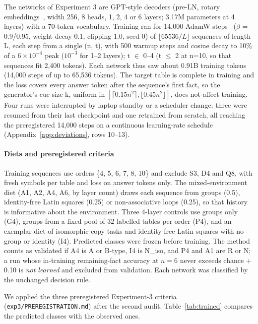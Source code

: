 \documentclass[11pt]{article}
\begin{document}
The networks of Experiment 3 are GPT-style decoders (pre-LN, rotary embeddings~\cite{su2021rope}, width 256, 8 heads, 1, 2, 4 or 6 layers; 3.17M parameters at 4 layers) with a 70-token vocabulary. Training ran for 14,000 AdamW steps~\cite{loshchilov2019adamw} ($\beta$ = 0.9/0.95, weight decay 0.1, clipping 1.0, seed 0) of $\lfloor 65536/L \rfloor$ sequences of length L, each step from a single (n, t), with 500 warmup steps and cosine decay to 10\% of a $6 \times 10^{-4}$ peak ($10^{-3}$ for 1--2 layers); t $\in$ 0--4 (t $\leq$ 2 at n=10, so that sequences fit 2,400 tokens). Each network thus saw about 0.91B training tokens (14,000 steps of up to 65,536 tokens). The target table is complete in training and the loss covers every answer token after the sequence's first fact, so the generator's cue size k, uniform in $[\lceil 0.15 n^{2} \rceil, \lfloor 0.45 n^{2} \rfloor]$, does not affect training. Four runs were interrupted by laptop standby or a scheduler change; three were resumed from their last checkpoint and one retrained from scratch, all reaching the preregistered 14,000 steps on a continuous learning-rate schedule (Appendix~\ref{app:deviations}, rows 10--13).

\paragraph{Diets and preregistered criteria}

Training sequences use orders \{4, 5, 6, 7, 8, 10\} and exclude S3, D4 and Q8, with fresh symbols per table and loss on answer tokens only. The mixed-environment diet (A1, A2, A4, A6, by layer count) draws each sequence from groups (0.5), identity-free Latin squares (0.25) or non-associative loops (0.25), so that history is informative about the environment. Three 4-layer controls use groups only (G4), groups from a fixed pool of 32 labelled tables per order (P4), and an exemplar diet of isomorphic-copy tasks and identity-free Latin squares with no group or identity (I4). Predicted classes were frozen before training. The method counts as validated if A4 is A or B-type, I4 is N\_iso, and P4 and A1 are R or N; a run whose in-training remaining-fact accuracy at $n = 6$ never exceeds chance + 0.10 is \emph{not learned} and excluded from validation. Each network was classified by the unchanged decision rule.

We applied the three preregistered Experiment-3 criteria (\texttt{exp3/\allowbreak{}PREREGISTRATION.md}) after the second audit. Table~\ref{tab:trained} compares the predicted classes with the observed ones.
\end{document}
